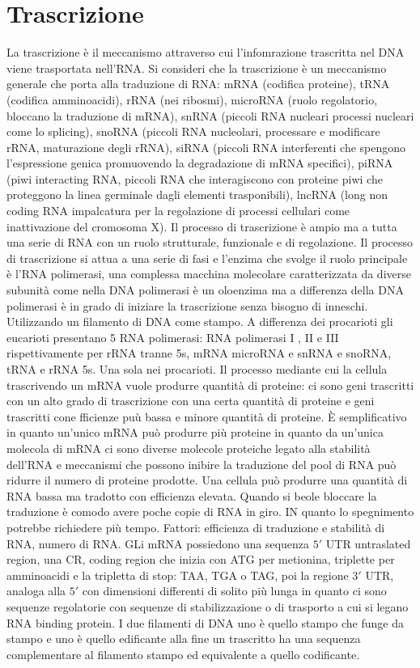 \chapter{Trascrizione}
La trascrizione \`e il meccanismo attraverso cui l'infomrazione trascritta nel DNA viene trasportata nell'RNA. Si consideri che la trascrizione \`e un meccanismo generale che porta
alla traduzione di RNA: mRNA (codifica proteine), tRNA (codifica amminoacidi), rRNA (nei ribosmi), microRNA (ruolo regolatorio, bloccano la traduzione di mRNA), snRNA (piccoli RNA 
nucleari processi nucleari come lo splicing), snoRNA (piccoli RNA nucleolari, processare e modificare rRNA, maturazione degli rRNA), siRNA (piccoli RNA interferenti che spengono 
l'espressione genica promuovendo la degradazione di mRNA specifici), piRNA (piwi interacting RNA, piccoli RNA che interagiscono con proteine piwi che proteggono la linea germinale dagli
elementi trasponibili), lncRNA (long non coding RNA impalcatura per la regolazione di processi cellulari come inattivazione del cromosoma X). Il processo di trascrizione \`e ampio ma a 
tutta una serie di RNA con un ruolo strutturale, funzionale e di regolazione. Il processo di trascrizione si attua a una serie di fasi e l'enzima che svolge il ruolo principale \`e l'RNA
polimerasi, una complessa macchina molecolare caratterizzata da diverse subunit\`a come nella DNA polimerasi \`e un oloenzima ma a differenza della DNA polimerasi \`e in grado di iniziare
la trascrizione senza bisogno di inneschi. Utilizzando un filamento di DNA come stampo. A differenza dei procarioti gli eucarioti presentano 5 RNA polimerasi: RNA polimerasi I , II e III
rispettivamente per rRNA tranne 5s, mRNA microRNA e snRNA e snoRNA, tRNA e rRNA 5s. Una sola nei procarioti. Il processo mediante cui la cellula trascrivendo un mRNA vuole produrre 
quantit\`a di proteine: ci sono geni trascritti con un alto grado di trascrizione con una certa quantit\`a di proteine e geni trascritti cone fficienze pu\`u bassa e minore quantit\`a 
di proteine. \`E semplificativo in quanto un'unico mRNA pu\`o produrre pi\`u proteine in quanto da un'unica molecola di mRNA ci sono diverse molecole proteiche legato alla stabilit\`a 
dell'RNA e meccanismi che possono inibire la traduzione del pool di RNA pu\`o ridurre il numero di proteine prodotte. Una cellula pu\`o produrre una quantit\`a di RNA bassa ma tradotto
con efficienza elevata. Quando si beole bloccare la traduzione \`e comodo avere poche copie di RNA in giro. IN quanto lo spegnimento potrebbe richiedere pi\`u tempo. Fattori: efficienza
di traduzione e stabilit\`a di RNA, numero di RNA. GLi mRNA possiedono una sequenza $5'$ UTR untraslated region, una CR, coding region che inizia con ATG per metionina, triplette per
amminoacidi e la tripletta di stop: TAA, TGA o TAG, poi la regione $3'$ UTR, analoga alla $5'$ con dimensioni differenti di solito pi\`u lunga in quanto ci sono sequenze regolatorie 
con sequenze di stabilizzazione o di trasporto a cui si legano RNA binding protein. I due filamenti di DNA uno \`e quello stampo che funge da stampo e uno \`e quello edificante alla fine
un trascritto ha una sequenza complementare al filamento stampo ed equivalente a quello codificante.
